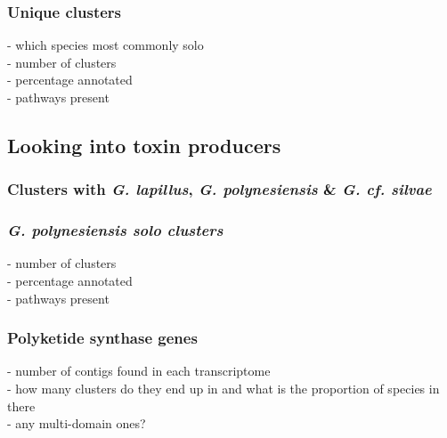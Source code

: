 \documentclass[12pt]{article}
\begin{document}
\subsubsection*{Unique clusters}
- which species most commonly solo\\
- number of clusters\\
- percentage annotated \\
- pathways present\\


\subsection*{Looking into toxin producers}
\subsubsection*{Clusters with \textit{G. lapillus}, \textit{G. polynesiensis} \& \textit{G. cf. silvae}}
\subsubsection*{\textit{G. polynesiensis solo clusters}}
- number of clusters\\
- percentage annotated \\
- pathways present\\
\subsubsection*{Polyketide synthase genes}
- number of contigs found in each transcriptome\\
- how many clusters do they end up in and what is the proportion of species in there \\
- any multi-domain ones?\\
\end{document}
